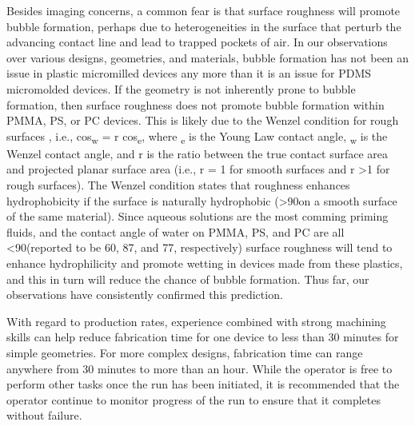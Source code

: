 Besides imaging concerns, a common fear is that surface roughness will promote bubble formation, perhaps due to heterogeneities in the surface that perturb the advancing contact line and lead to trapped pockets of air. In our observations over various designs, geometries, and materials, bubble formation has not been an issue in plastic micromilled devices any more than it is an issue for PDMS micromolded devices. If the geometry is not inherently prone to bubble formation, then surface roughness does not promote bubble formation within PMMA, PS, or PC devices. This is likely due to the Wenzel condition for rough surfaces \cite{Wenzel2002RESISTANCEWATER,Ouali2013}, i.e., cos\texttheta\textsubscript{w} = r cos\texttheta\textsubscript{e}, where \texttheta\textsubscript{e} is the Young Law contact angle, \texttheta\textsubscript{w} is the Wenzel contact angle, and r is the ratio between the true contact surface area and projected planar surface area (i.e., r = 1 for smooth surfaces and r \textgreater 1 for rough surfaces). The Wenzel condition states that roughness enhances hydrophobicity if the surface is naturally hydrophobic (\texttheta\textgreater90\textdegree on a smooth surface of the same material). Since aqueous solutions are the most comming priming fluids, and the contact angle of water on PMMA, PS, and PC are all \textless 90\textdegree (reported to be 60\textdegree, 87\textdegree, and 77\textdegree, respectively)\cite{Montez2011} surface roughness will tend to enhance hydrophilicity and promote wetting in devices made from these plastics, and this in turn will reduce the chance of bubble formation. Thus far, our observations have consistently confirmed this prediction.

With regard to production rates, experience combined with strong machining skills can help reduce fabrication time for one device to less than 30 minutes for simple geometries. For more complex designs, fabrication time can range anywhere from 30 minutes to more than an hour. While the operator is free to perform other tasks once the run has been initiated, it is recommended that the operator continue to monitor progress of the run to ensure that it completes without failure.

